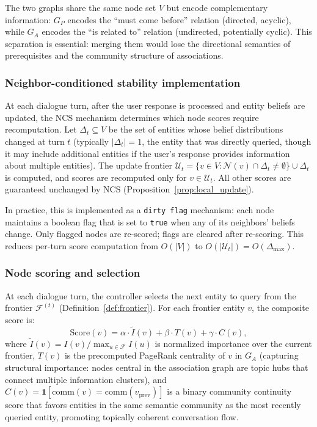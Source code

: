 \documentclass[11pt,a4paper]{article}
\begin{document}
The two graphs share the same node set $V$ but encode complementary
information: $G_P$ encodes the ``must come before'' relation (directed,
acyclic), while $G_A$ encodes the ``is related to'' relation (undirected,
potentially cyclic). This separation is essential: merging them would lose
the directional semantics of prerequisites and the community structure of
associations.

\subsubsection{Neighbor-conditioned stability implementation}

At each dialogue turn, after the user response is processed and entity
beliefs are updated, the NCS mechanism determines which node scores require
recomputation. Let $\Delta_t \subseteq V$ be the set of entities whose belief
distributions changed at turn $t$ (typically $|\Delta_t| = 1$, the entity
that was directly queried, though it may include additional entities if the
user's response provides information about multiple entities). The update
frontier $\mathcal{U}_t = \{v \in V : \mathcal{N}(v) \cap \Delta_t \neq
\emptyset\} \cup \Delta_t$ is computed, and scores are recomputed only for
$v \in \mathcal{U}_t$. All other scores are guaranteed unchanged by NCS
(Proposition~\ref{prop:local_update}).

In practice, this is implemented as a \texttt{dirty flag} mechanism: each
node maintains a boolean flag that is set to \texttt{true} when any of its
neighbors' beliefs change. Only flagged nodes are re-scored; flags are
cleared after re-scoring. This reduces per-turn score computation from
$O(|V|)$ to $O(|\mathcal{U}_t|) = O(\Delta_{\max})$.

\subsubsection{Node scoring and selection}

At each dialogue turn, the controller selects the next entity to query from
the frontier $\mathcal{F}^{(t)}$ (Definition~\ref{def:frontier}). For each
frontier entity $v$, the composite score is:
\begin{equation}
  \mathrm{Score}(v) = \alpha \cdot \tilde{I}(v) + \beta \cdot T(v)
    + \gamma \cdot C(v),
  \label{eq:score}
\end{equation}
where $\tilde{I}(v) = I(v) / \max_{u \in \mathcal{F}} I(u)$ is normalized
importance over the current frontier, $T(v)$ is the precomputed PageRank
centrality of $v$ in $G_A$ (capturing structural importance: nodes central in
the association graph are topic hubs that connect multiple information
clusters), and $C(v) = \mathbf{1}[\mathrm{comm}(v) =
\mathrm{comm}(v_{\mathrm{prev}})]$ is a binary community continuity score
that favors entities in the same semantic community as the most recently
queried entity, promoting topically coherent conversation flow.
\end{document}
